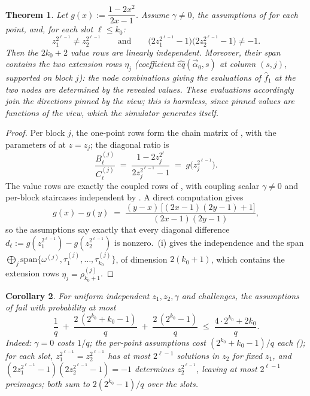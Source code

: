 \documentclass{article}
\newtheorem{theorem}{Theorem}[section]
\newtheorem{corollary}[theorem]{Corollary}
\theoremstyle{definition}
\begin{document}
\begin{theorem}\label{thm:twopoint}
Let $g(x) := \dfrac{1 - 2x^2}{2x - 1}$. Assume $\gamma \neq 0$, the assumptions of  for each point, and, for each slot $\ell \leq k_0$:
\[
z_1^{2^{\ell-1}} \neq z_2^{2^{\ell-1}} \qquad \text{and} \qquad \big(2z_1^{2^{\ell-1}} - 1\big)\big(2z_2^{2^{\ell-1}} - 1\big) \neq -1 .
\]
Then the $2k_0 + 2$ value rows are linearly independent. Moreover, their span contains the two extension rows $\eta_j$ (coefficient $\hat{eq}(\vec{\alpha}_0, s)$ at column $(s,j)$, supported on block $j$): the node combinations giving the evaluations of $\hat{f}_1$ at the two nodes are determined by the revealed values. These evaluations accordingly join the directions pinned by the view; this is harmless, since pinned values are functions of the view, which the simulator generates itself.
\end{theorem}

\begin{proof}
Per block $j$, the one-point rows form the chain matrix of , with the parameters of  at $z = z_j$; the diagonal ratio is
\[
\frac{B^{(j)}_\ell}{C^{(j)}_\ell} \;=\; \frac{1 - 2 z_j^{2^{\ell}}}{2 z_j^{2^{\ell-1}} - 1} \;=\; g\big(z_j^{2^{\ell-1}}\big) .
\]
The value rows are exactly the coupled rows of , with coupling scalar $\gamma \neq 0$ and per-block staircases independent by . A direct computation gives
\[
g(x) - g(y) \;=\; \frac{(y - x)\,\big[(2x-1)(2y-1) + 1\big]}{(2x-1)(2y-1)} ,
\]
so the assumptions say exactly that every diagonal difference $d_\ell := g(z_1^{2^{\ell-1}}) - g(z_2^{2^{\ell-1}})$ is nonzero. \,(i) gives the independence and the span $\bigoplus_j \mathrm{span}\{\omega^{(j)}, \tau^{(j)}_1, \dots, \tau^{(j)}_{k_0}\}$, of dimension $2(k_0+1)$, which contains the extension rows $\eta_j = \rho^{(j)}_{k_0+1}$.
\end{proof}

\begin{corollary}\label{cor:twopointprob}
For uniform independent $z_1, z_2, \gamma$ and challenges, the assumptions of  fail with probability at most
\[
\frac{1}{q} \;+\; \frac{2\,(2^{k_0} + k_0 - 1)}{q} \;+\; \frac{2\,(2^{k_0} - 1)}{q} \;\leq\; \frac{4 \cdot 2^{k_0} + 2 k_0}{q} .
\]
Indeed: $\gamma = 0$ costs $1/q$; the per-point assumptions cost $(2^{k_0} + k_0 - 1)/q$ each (); for each slot, $z_1^{2^{\ell-1}} = z_2^{2^{\ell-1}}$ has at most $2^{\ell-1}$ solutions in $z_2$ for fixed $z_1$, and $(2z_1^{2^{\ell-1}} - 1)(2z_2^{2^{\ell-1}} - 1) = -1$ determines $z_2^{2^{\ell-1}}$, leaving at most $2^{\ell - 1}$ preimages; both sum to $2(2^{k_0} - 1)/q$ over the slots.
\end{corollary}
\end{document}
